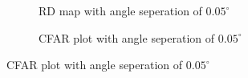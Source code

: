 \documentclass[12pt,DIV14,BCOR12mm,a4paper,footinclude=false,headinclude,parskip=half-,twoside,openright,cleardoublepage=empty,toc=index,bibliography=totoc,listof=totoc]{scrreprt}
\numberwithin{equation}{chapter}
\begin{document}
\begin{figure}[t]
        \centering
        \begin{subfigure}{0.45\textwidth}
            \centering
            \caption{RD map with angle seperation of $0.05^{\circ}$}
        \end{subfigure}\hspace{0.5cm}
        \begin{subfigure}{0.45\textwidth}
            \centering
            \caption{CFAR plot with angle seperation of $0.05^{\circ}$}

\end{subfigure}
\end{figure}
\end{document}
